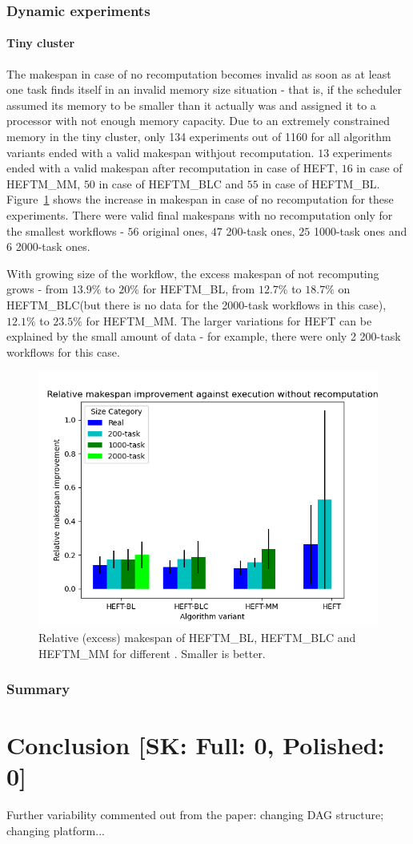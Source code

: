 \documentclass[conference]{IEEEtran}
\newcommand{\algo}[1]{\textsc{#1}}
\newcommand{\heft}{\algo{HEFT}\xspace}
\newcommand{\heftmm}{\algo{HEFTM\_MM}\xspace}
\newcommand{\heftbl}{\algo{HEFTM\_BL}\xspace}
\newcommand{\heftblc}{\algo{HEFTM\_BLC}\xspace}
\newcommand{\skug}[1]{{\color{blue}[SK: #1]}}
\begin{document}
    \subsubsection{Dynamic experiments}
    \paragraph{Tiny cluster}
    The makespan in case of no recomputation becomes invalid as soon as at least one task finds itself in an invalid memory size
    situation - that is, if the scheduler assumed its memory to be smaller than it actually was and assigned it to a processor
    with not enough memory capacity.
    Due to an extremely constrained memory in the tiny cluster, only 134 experiments out of 1160 for all algorithm variants
    ended with a valid makespan withjout recomputation. $13$ experiments ended with a valid makespan after recomputation in case of \heft,
   $16$ in case of \heftmm, $50$ in case of \heftblc and $55$ in case of \heftbl.
    Figure~\ref{fig:updates-ms} shows the increase in makespan in case of no recomputation for these experiments.
    There were valid final makespans with no recomputation only for the smallest workflows - $56$ original ones, $47$ 200-task ones,
    $25$ 1000-task ones and $6$ 2000-task ones.

    With growing size of the workflow, the excess makespan of not recomputing grows - from $13.9\%$ to $20\%$ for \heftbl,
    from $12.7\%$ to $18.7\%$ on \heftblc (but there is no data for the 2000-task workflows in this case), $12.1\%$ to $23.5\%$
    for \heftmm.
    The larger variations for \heft can be explained by the small amount of data - for example, there were only 2 200-task
    workflows for this case.

    \begin{figure}[tb]
        \centering
        \includegraphics[width=0.495\columnwidth] {images/UpdatesMss2}
        \caption{Relative (excess) makespan of \heftbl, \heftblc and \heftmm for different . Smaller is better.}
        \label{fig:updates-ms}
        \vspace{-0.3cm}
    \end{figure}


    \subsubsection{Summary}

    \section{Conclusion  \skug{Full: 0, Polished: 0}}

Further variability commented out from the paper: changing DAG structure; changing platform...


    
    
\end{document}
